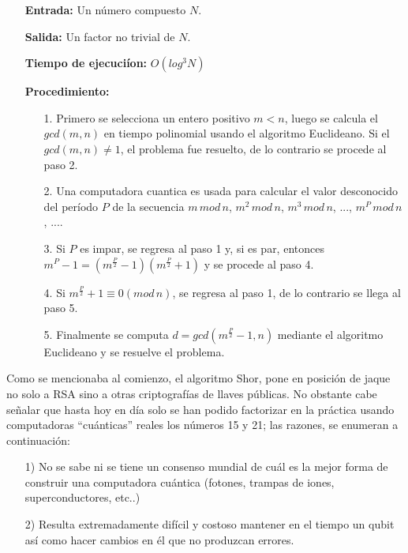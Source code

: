 \documentclass[a4paper,11pt]{article}
\begin{document}
\begin{itemize}
    \item[] {\bfseries Entrada:} Un n\'umero compuesto $N$.
    \item[] {\bfseries Salida:} Un factor no trivial de $N$.
    \item[] {\bfseries Tiempo de ejecuci\'ion:} $O(log^3 N)$
    \item[] {\bfseries Procedimiento:}
    \begin{itemize}
        \item[1.] Primero se selecciona un entero positivo $m<n$, luego se calcula el $gcd(m,n)$ en tiempo polinomial usando el algoritmo Euclideano. Si el $gcd(m,n)\neq 1$, el problema fue resuelto, de lo contrario se procede al paso 2.
        \item[2.] Una computadora cuantica es usada para calcular el valor desconocido del per\'iodo $P$ de la secuencia $m\, mod\, n$, $m^2\, mod\, n$, $m^3\, mod\, n$, ..., $m^P\, mod\, n$, ....
        \item[3.] Si $P$ es impar, se regresa al paso 1 y, si es par, entonces $m^P-1=(m^{\frac{P}{2}}-1)(m^{\frac{P}{2}}+1)$ y se procede al paso 4.
        \item[4.] Si $m^{\frac{P}{2}}+1 \equiv 0 (mod\, n)$, se regresa al paso 1, de lo contrario se llega al paso 5.
        \item[5.] Finalmente se computa $d=gcd(m^{\frac{P}{2}}-1,n)$ mediante el algoritmo Euclideano y se resuelve el problema.
    \end{itemize}
\end{itemize}

\par Como se mencionaba al comienzo, el algoritmo Shor, pone en posición de jaque no solo a RSA sino a otras criptografías de llaves públicas. No obstante cabe señalar que hasta hoy en día solo se han podido factorizar en la práctica usando computadoras ``cuánticas” reales los números 15 y 21; las razones, se enumeran a continuación:
\begin{itemize}
    \item[1)] No se sabe ni se tiene un consenso mundial de cuál es la mejor forma de construir una computadora cuántica (fotones, trampas de iones, superconductores, etc..)
    \item[2)]  Resulta extremadamente difícil y costoso mantener en el tiempo un qubit así como hacer cambios en él que no produzcan errores.
\end{itemize}
\end{document}
